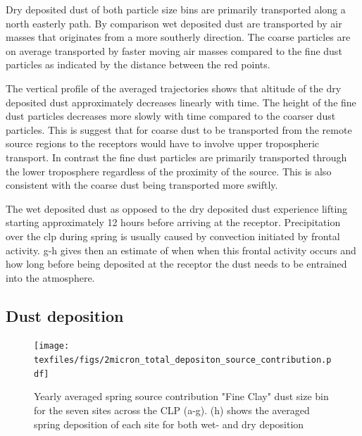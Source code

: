 Dry deposited dust of both particle size bins are primarily transported along a north easterly path. 
By comparison wet deposited dust are transported by air masses that originates from a more southerly direction. The coarse particles are on average transported by faster moving air masses compared to the fine dust particles as indicated by the distance between the red points.     

The vertical profile of the averaged trajectories shows that altitude of the dry deposited dust approximately decreases linearly with time. The height of the fine dust particles decreases more slowly with time compared to the coarser dust particles. This is suggest that for coarse dust to be transported from the remote source regions to the receptors would have to involve upper tropospheric transport. In contrast the fine dust particles are primarily transported through the lower troposphere regardless of the proximity of the source. This is also consistent with the coarse dust being transported more swiftly.  

The wet deposited dust as opposed to the dry deposited dust experience lifting starting approximately 12 hours before arriving at the receptor. Precipitation over the \acrshort{clp} during spring is usually caused by convection initiated by frontal activity. g-h gives then an estimate of when when this frontal activity occurs and how long before being deposited at the receptor the dust needs to be entrained into the atmosphere.  
\subsection{Dust deposition}
\begin{figure}[htbp]
    \centering
    \texttt{[image: texfiles/figs/2micron\_total\_depositon\_source\_contribution.pdf]}
    \caption{Yearly averaged spring source contribution "Fine Clay" dust size bin for the seven sites across the CLP (a-g). (h) shows the averaged spring deposition of each site for both wet- and dry deposition}
    \label{fig:source_contrib_2mmu}
\end{figure}


